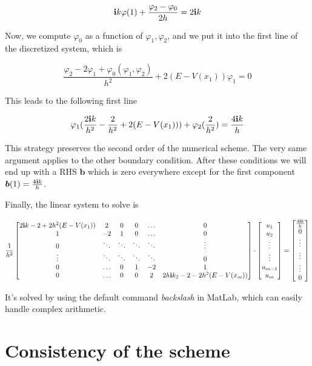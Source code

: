\documentclass[a4paper,oneside]{book}
\theoremstyle{definition}
\theoremstyle{plain}
\newcommand{\var}{\varphi}
\begin{document}
\[ \bold{i} k \var(1)+ \frac{\var_2-\var_0}{2h}=2 \bold{i} k \]

Now, we compute $\var_0$ as a function of $\var_1, \var_2$, and we put it into the first line of the discretized system, which is 

\[ \frac{\var_2 - 2\var_1+\var_0(\var_1,\var_2)}{h^2}+ 2(E-V(x_1))\var_1=0\]


This leads to the following first line  

\[ \var_1 (\frac{2 \bold{i}k}{h^2}-\frac{2}{h^2}+2(E-V(x_1))) + \var_2 (\frac{2}{h^2})=\frac{4 \bold{i}k}{h}\]

This strategy preserves the second order of the numerical scheme. The very same argument applies to the other boundary condition. After these conditions we will end up with a RHS $\boldsymbol{b}$ which is zero everywhere except for the first component $\boldsymbol{b}(1)=\frac{ 4 \bold{i} k}{h}$.

Finally, the linear system to solve is 


\[
\frac{1}{h^2}
\begin{bmatrix}
2 \bold{i}k-2+2h^2(E-V(x_1)) & 2 & 0 & 0 & \dots & 0 \\
1 & -2 & 1 & 0 & \dots & 0 \\
0 & \ddots & \ddots & \ddots & \ddots & \vdots \\
\vdots & \ddots & \ddots & \ddots & \ddots & 0 \\
0 & \dots & 0 & 1 & -2 & 1 \\
0 & \dots & 0 & 0 & 2 & 2 h \bold{i} k_2 - 2 -2 h^2 (E-V(x_m))
\end{bmatrix} 
\cdot
\begin{bmatrix}
u_1 \\
u_2 \\
\vdots \\
\vdots \\
u_{m-1} \\
u_m
\end{bmatrix}
=
\begin{bmatrix}
\frac{4 \bold{i}k}{h} \\
0 \\
\vdots \\
\vdots \\
\vdots \\
0
\end{bmatrix}
\]

It's solved by using the default command \emph{backslash} in MatLab, which can easily handle complex arithmetic.


\section{Consistency of the scheme}
\end{document}
